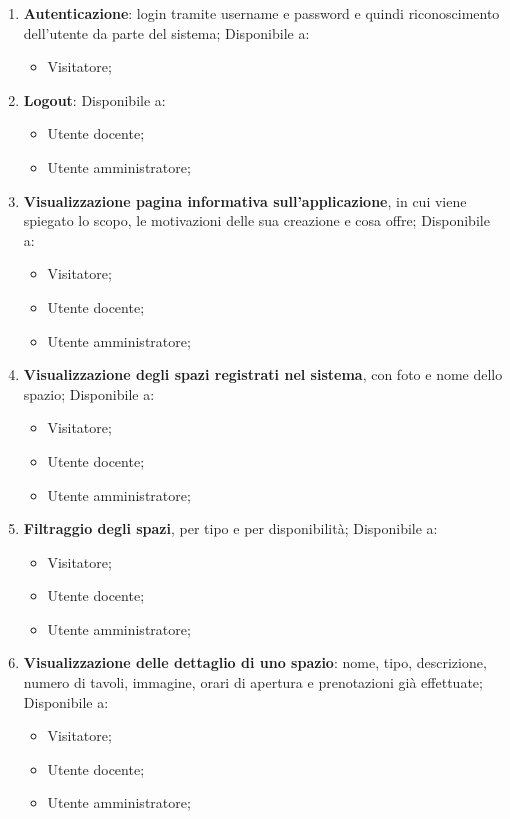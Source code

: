 \begin{enumerate}
	\item \textbf{Autenticazione}: login tramite username e password e quindi
	      riconoscimento dell'utente da parte del sistema; Disponibile a:
	      \begin{itemize}
		      \item Visitatore;
	      \end{itemize}

	\item \textbf{Logout}: Disponibile a:
	      \begin{itemize}
		      \item Utente docente;
		      \item Utente amministratore;
	      \end{itemize}

	\item \textbf{Visualizzazione pagina informativa sull'applicazione}, in cui
	      viene spiegato lo scopo, le motivazioni delle sua creazione e cosa
	      offre;
	      Disponibile a:
	      \begin{itemize}
		      \item Visitatore;
		      \item Utente docente;
		      \item Utente amministratore;
	      \end{itemize}

	\item \textbf{Visualizzazione degli spazi registrati nel sistema}, con foto
	      e nome dello spazio; Disponibile a:
	      \begin{itemize}
		      \item Visitatore;
		      \item Utente docente;
		      \item Utente amministratore;
	      \end{itemize}

	\item \textbf{Filtraggio degli spazi}, per tipo e per disponibilità;
	      Disponibile a:
	      \begin{itemize}
		      \item Visitatore;
		      \item Utente docente;
		      \item Utente amministratore;
	      \end{itemize}

	\item \textbf{Visualizzazione delle dettaglio di uno spazio}:
	      nome, tipo, descrizione, numero di tavoli, immagine, orari di
	      apertura e prenotazioni già effettuate; Disponibile a:
	      \begin{itemize}
		      \item Visitatore;
		      \item Utente docente;
		      \item Utente amministratore;
	      \end{itemize}


\end{enumerate}
